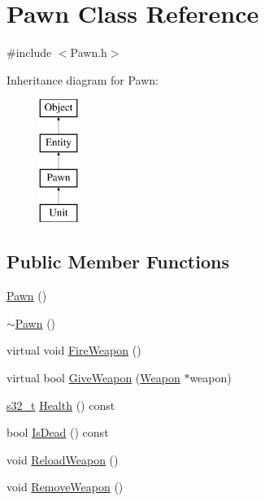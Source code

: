 \section{Pawn Class Reference}
\label{class_pawn}


{\ttfamily \#include $<$Pawn.\-h$>$}

Inheritance diagram for Pawn\-:\begin{figure}[H]
\begin{center}
\leavevmode
\includegraphics[height=4.000000cm]{class_pawn}
\end{center}
\end{figure}
\subsection*{Public Member Functions}
\begin{DoxyCompactItemize}
\item 
\hyperlink{class_pawn_ab7880b10c514f4b9fab9766fbe7c06fd}{Pawn} ()
\item 
\hyperlink{class_pawn_a3095938fb8326469c3bd05da0b8f50af}{$\sim$\-Pawn} ()
\item 
virtual void \hyperlink{class_pawn_a42f7e429e2ba92bc057d45ce0950d3ca}{Fire\-Weapon} ()
\item 
virtual bool \hyperlink{class_pawn_ad745a3758a8e801b484dadd39071c492}{Give\-Weapon} (\hyperlink{class_weapon}{Weapon} $\ast$weapon)
\item 
\hyperlink{types_8h_aeeae8d6781b7e821dd3e743202314d66}{s32\-\_\-t} \hyperlink{class_pawn_a228f2c679de9cd06cde2144fe44d9437}{Health} () const 
\item 
bool \hyperlink{class_pawn_a8d73d6bb3cd96916b6257ad9aaf9e8c1}{Is\-Dead} () const 
\item 
void \hyperlink{class_pawn_a7a97c270622036e644c54ad5f13a1cf5}{Reload\-Weapon} ()
\item 
void \hyperlink{class_pawn_aa90523cf62ddf7a356554d80e01540b5}{Remove\-Weapon} ()
\end{DoxyCompactItemize}
